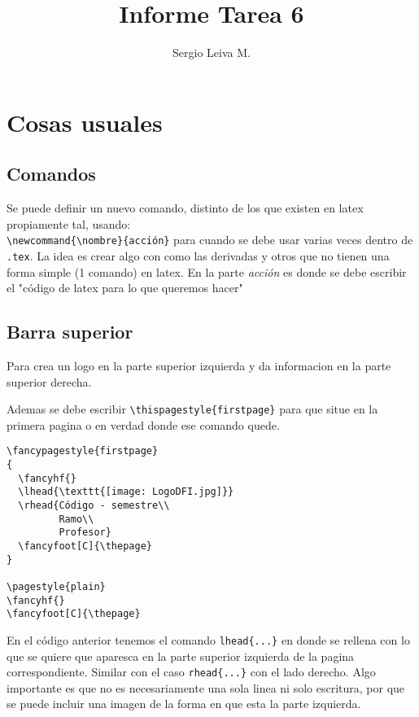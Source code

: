 \documentclass[letter,10pt]{article}
\begin{document}
\author{Sergio Leiva M.}
\title{\textbf{Informe Tarea 6}}
\maketitle

\section{Cosas usuales}

\subsection{Comandos}
Se puede definir un nuevo comando, distinto de los que existen en latex propiamente tal, usando: \\
 \verb+\newcommand{\nombre}{acción}+ para cuando se debe usar varias veces dentro de \verb+.tex+. La idea es crear algo  con como las derivadas y otros que no tienen una forma simple (1 comando) en latex. En la parte \textit{acción} es donde se debe escribir el "código de latex para lo que queremos hacer" 


\subsection{Barra superior}
Para crea un logo en la parte superior izquierda y da informacion en la parte superior derecha. 

 Ademas se debe escribir \verb+\thispagestyle{firstpage}+ para que situe en la primera pagina o en verdad donde ese comando quede.

\begin{verbatim} 
\fancypagestyle{firstpage}
{
  \fancyhf{}
  \lhead{\texttt{[image: LogoDFI.jpg]}}
  \rhead{Código - semestre\\
         Ramo\\
         Profesor}
  \fancyfoot[C]{\thepage}
}

\pagestyle{plain}
\fancyhf{}
\fancyfoot[C]{\thepage}

\end{verbatim}


En el código anterior tenemos el comando \verb+lhead{...}+ en donde se rellena con lo que se quiere que aparesca en la parte superior izquierda de la pagina correspondiente. Similar con el caso \verb+rhead{...}+ con el lado derecho. Algo importante es que no es necesariamente una sola linea ni solo escritura, por que se puede incluir una imagen de la forma en que esta la parte izquierda.
\end{document}
